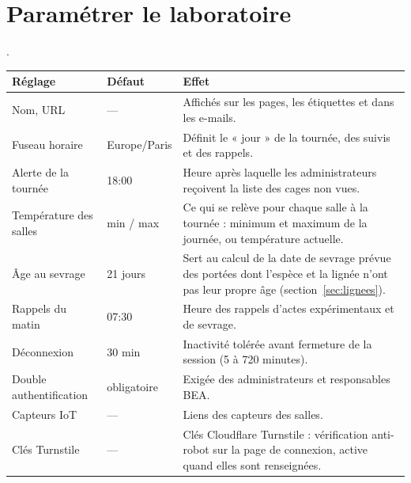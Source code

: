\documentclass[11pt,a4paper]{article}
\begin{document}
\section{Paramétrer le laboratoire}
.
\begin{center}
\begin{tabularx}{\textwidth}{@{}lp{2.5cm}X@{}}
\toprule
\textbf{Réglage} & \textbf{Défaut} & \textbf{Effet}\\
\midrule
Nom, URL & --- & Affichés sur les pages, les étiquettes et dans les e-mails.\\
Fuseau horaire & Europe/Paris & Définit le « jour » de la tournée, des suivis et des rappels.\\
Alerte de la tournée & 18:00 & Heure après laquelle les administrateurs reçoivent la liste des cages non vues.\\
Température des salles & min / max & Ce qui se relève pour chaque salle à la tournée : minimum et maximum de la journée, ou température actuelle.\\
Âge au sevrage & 21 jours & Sert au calcul de la date de sevrage prévue des portées dont l'espèce et la lignée n'ont pas leur propre âge (section~\ref{sec:lignees}).\\
Rappels du matin & 07:30 & Heure des rappels d'actes expérimentaux et de sevrage.\\
Déconnexion & 30 min & Inactivité tolérée avant fermeture de la session (5 à 720 minutes).\\
Double authentification & obligatoire & Exigée des administrateurs et responsables BEA.\\
Capteurs IoT & --- & Liens des capteurs des salles.\\
Clés Turnstile & --- & Clés Cloudflare Turnstile : vérification anti-robot sur la page de connexion, active quand elles sont renseignées.\\
\bottomrule
\end{tabularx}
\end{center}
\end{document}
